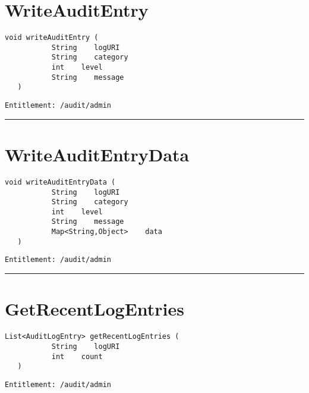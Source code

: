 \section{WriteAuditEntry}
\label{Api:WriteAuditEntry}
\begin{lstlisting}[style=nonumbers]
   void writeAuditEntry (
           String    logURI
           String    category
           int    level
           String    message
   )
\end{lstlisting}
\begin{Verbatim}[formatcom=\color{Maroon}]
  Entitlement: /audit/admin
\end{Verbatim}



\rule{12cm}{2pt}
\section{WriteAuditEntryData}
\label{Api:WriteAuditEntryData}
\begin{lstlisting}[style=nonumbers]
   void writeAuditEntryData (
           String    logURI
           String    category
           int    level
           String    message
           Map<String,Object>    data
   )
\end{lstlisting}
\begin{Verbatim}[formatcom=\color{Maroon}]
  Entitlement: /audit/admin
\end{Verbatim}



\rule{12cm}{2pt}
\section{GetRecentLogEntries}
\label{Api:GetRecentLogEntries}
\begin{lstlisting}[style=nonumbers]
   List<AuditLogEntry> getRecentLogEntries (
           String    logURI
           int    count
   )
\end{lstlisting}
\begin{Verbatim}[formatcom=\color{Maroon}]
  Entitlement: /audit/admin
\end{Verbatim}



